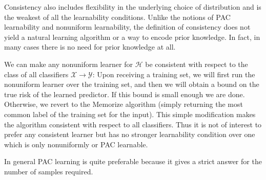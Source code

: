 Consistency also includes flexibility in the underlying choice of distribution and is the weakest of all the learnability conditions.
Unlike the notions of PAC learnability and nonuniform learnability, the definition of consistency does not yield a 
natural learning algorithm or a way to encode prior knowledge. 
In fact, in many cases there is no need for prior knowledge at all.

We can make any nonuniform learner for \( \mathcal{H} \) be consistent with respect to the class of all classifiers \( \mathcal{X} \to \mathcal{Y} \):
Upon receiving a training set, we will first run the nonuniform learner over the training set, and then we will obtain a bound
on the true risk of the learned predictor. If this bound is small enough we are
done. Otherwise, we revert to the Memorize algorithm (simply returning the most common label of the training set for the input). 
This simple modification makes the algorithm consistent with respect to all classifiers.
Thus it is not of interest to prefer any consistent learner but has no stronger learnability condition over one which is 
only nonuniformly or PAC learnable.

In general PAC learning is quite preferable because it gives a strict answer for the number of samples required.
